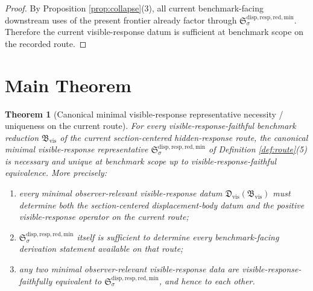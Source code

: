 \documentclass[11pt]{article}
\newcommand{\MinimalReducedStructure}{\mathfrak S^{\mathrm{disp,resp,red,min}}}
\newcommand{\VisibleReduction}{\mathfrak B_{\mathrm{vis}}}
\newcommand{\VisibleDatum}{\mathfrak D_{\mathrm{vis}}}
\newtheorem{theorem}{Theorem}
\begin{document}
\begin{proof}
By Proposition \ref{prop:collapse}(3), all current benchmark-facing downstream uses of the present frontier already factor through \(\MinimalReducedStructure_{\sigma}\). Therefore the current visible-response datum is sufficient at benchmark scope on the recorded route.
\end{proof}

\section{Main Theorem}

\begin{theorem}[Canonical minimal visible-response representative necessity / uniqueness on the current route]
\label{thm:main}
For every visible-response-faithful benchmark reduction \(\VisibleReduction\) of the current section-centered hidden-response route, the canonical minimal visible-response representative \(\MinimalReducedStructure_{\sigma}\) of Definition \ref{def:route}(5) is necessary and unique at benchmark scope up to visible-response-faithful equivalence. More precisely:
\begin{enumerate}
    \item every minimal observer-relevant visible-response datum \(\VisibleDatum(\VisibleReduction)\) must determine both the section-centered displacement-body datum and the positive visible-response operator on the current route;
    \item \(\MinimalReducedStructure_{\sigma}\) itself is sufficient to determine every benchmark-facing derivation statement available on that route;
    \item any two minimal observer-relevant visible-response data are visible-response-faithfully equivalent to \(\MinimalReducedStructure_{\sigma}\), and hence to each other.
\end{enumerate}
\end{theorem}
\end{document}
